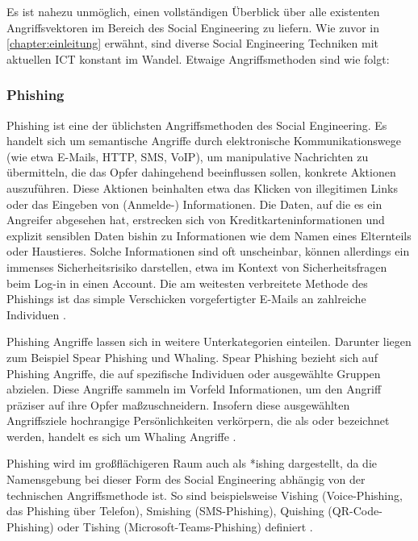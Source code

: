 Es ist nahezu unmöglich, einen vollständigen Überblick über alle existenten Angriffsvektoren im Bereich des Social Engineering
zu liefern. Wie zuvor in \autoref{chapter:einleitung} erwähnt, sind diverse Social Engineering Techniken mit aktuellen ICT konstant im Wandel.
Etwaige Angriffsmethoden sind wie folgt:

\subsubsection{Phishing}
\label{phishing}
Phishing ist eine der üblichsten Angriffsmethoden des Social Engineering. Es handelt sich um semantische Angriffe durch elektronische
Kommunikationswege (wie etwa E-Mails, HTTP, SMS, VoIP), um manipulative Nachrichten zu übermitteln, die das Opfer dahingehend beeinflussen
sollen, konkrete Aktionen auszuführen. Diese Aktionen beinhalten etwa das Klicken von illegitimen Links oder das Eingeben von (Anmelde-) Informationen.
Die Daten, auf die es ein Angreifer abgesehen hat, erstrecken sich von Kreditkarteninformationen und explizit sensiblen Daten bishin zu Informationen
wie dem Namen eines Elternteils oder Haustieres. Solche Informationen sind oft unscheinbar, können allerdings ein immenses Sicherheitsrisiko
darstellen, etwa im Kontext von Sicherheitsfragen beim Log-in in einen Account. Die am weitesten verbreitete Methode des Phishings ist das
simple Verschicken vorgefertigter E-Mails an zahlreiche Individuen .

Phishing Angriffe lassen sich in weitere Unterkategorien einteilen. Darunter liegen zum Beispiel Spear Phishing und Whaling.
Spear Phishing bezieht sich auf Phishing Angriffe, die auf spezifische Individuen oder ausgewählte Gruppen abzielen.
Diese Angriffe sammeln im Vorfeld Informationen, um den Angriff präziser auf ihre Opfer maßzuschneidern. Insofern diese ausgewählten Angriffsziele
hochrangige Persönlichkeiten verkörpern, die als  oder  bezeichnet werden, handelt es sich um Whaling Angriffe .

Phishing wird im großflächigeren Raum auch als *ishing dargestellt, da die Namensgebung bei dieser Form des Social Engineering abhängig von der
technischen Angriffsmethode ist. So sind beispielsweise Vishing (Voice-Phishing, das Phishing über Telefon), Smishing (SMS-Phishing),
Quishing (QR-Code-Phishing) oder Tishing (Microsoft-Teams-Phishing) definiert .

